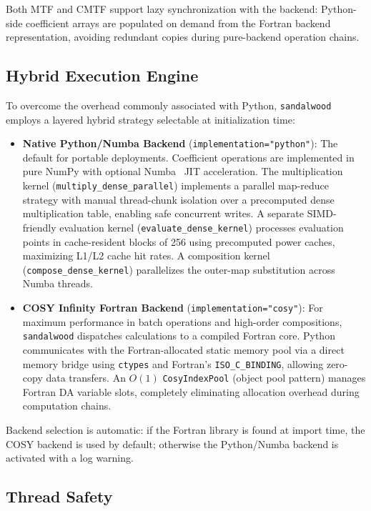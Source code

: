 \documentclass[aps,prb,reprint,superscriptaddress,nofootinbib]{revtex4-2}
\begin{document}
Both MTF and CMTF support lazy synchronization with the backend: Python-side coefficient arrays are populated on demand from the Fortran backend representation, avoiding redundant copies during pure-backend operation chains.

\subsection{Hybrid Execution Engine}

To overcome the overhead commonly associated with Python, \texttt{sandalwood} employs a layered hybrid strategy selectable at initialization time:

\begin{itemize}
    \item \textbf{Native Python/Numba Backend} (\texttt{implementation="python"}): The default for portable deployments. Coefficient operations are implemented in pure NumPy with optional Numba~\cite{lam2015numba} JIT acceleration. The multiplication kernel (\texttt{multiply\_dense\_parallel}) implements a parallel map-reduce strategy with manual thread-chunk isolation over a precomputed dense multiplication table, enabling safe concurrent writes. A separate SIMD-friendly evaluation kernel (\texttt{evaluate\_dense\_kernel}) processes evaluation points in cache-resident blocks of 256 using precomputed power caches, maximizing L1/L2 cache hit rates. A composition kernel (\texttt{compose\_dense\_kernel}) parallelizes the outer-map substitution across Numba threads.

    \item \textbf{COSY Infinity Fortran Backend} (\texttt{implementation="cosy"}): For maximum performance in batch operations and high-order compositions, \texttt{sandalwood} dispatches calculations to a compiled Fortran core. Python communicates with the Fortran-allocated static memory pool via a direct memory bridge using \texttt{ctypes} and Fortran's \texttt{ISO\_C\_BINDING}, allowing zero-copy data transfers. An $O(1)$ \texttt{CosyIndexPool} (object pool pattern) manages Fortran DA variable slots, completely eliminating allocation overhead during computation chains.
\end{itemize}

Backend selection is automatic: if the Fortran library is found at import time, the COSY backend is used by default; otherwise the Python/Numba backend is activated with a log warning.

\subsection{Thread Safety}
\end{document}
